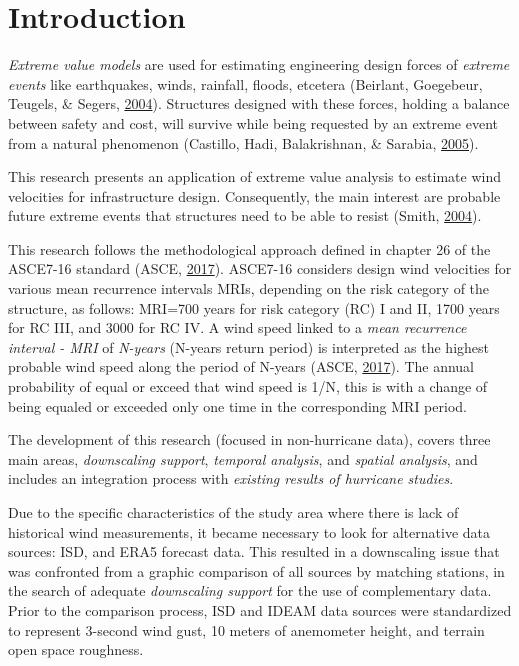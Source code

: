 \documentclass[12pt,twoside]{reedthesis}
\begin{document}
\hypertarget{introduction}{%
\chapter{Introduction}\label{introduction}}

\emph{Extreme value models} are used for estimating engineering design forces of \emph{extreme events} like earthquakes, winds, rainfall, floods, etcetera (Beirlant, Goegebeur, Teugels, \& Segers, \protect\hyperlink{ref-Beirlant2004}{2004}). Structures designed with these forces, holding a balance between safety and cost, will survive while being requested by an extreme event from a natural phenomenon (Castillo, Hadi, Balakrishnan, \& Sarabia, \protect\hyperlink{ref-Castillo2005}{2005}).

This research presents an application of extreme value analysis to estimate wind velocities for infrastructure design. Consequently, the main interest are probable future extreme events that structures need to be able to resist (Smith, \protect\hyperlink{ref-Smith2004}{2004}).

This research follows the methodological approach defined in chapter 26 of the ASCE7-16 standard (ASCE, \protect\hyperlink{ref-Asce2017}{2017}). ASCE7-16 considers design wind velocities for various mean recurrence intervals MRIs, depending on the risk category of the structure, as follows: MRI=700 years for risk category (RC) I and II, 1700 years for RC III, and 3000 for RC IV. A wind speed linked to a \emph{mean recurrence interval - MRI} of \emph{N-years} (N-years return period) is interpreted as the highest probable wind speed along the period of N-years (ASCE, \protect\hyperlink{ref-Asce2017}{2017}). The annual probability of equal or exceed that wind speed is 1/N, this is with a change of being equaled or exceeded only one time in the corresponding MRI period.

The development of this research (focused in non-hurricane data), covers three main areas, \emph{downscaling support}, \emph{temporal analysis}, and \emph{spatial analysis}, and includes an integration process with \emph{existing results of hurricane studies}.

Due to the specific characteristics of the study area where there is lack of historical wind measurements, it became necessary to look for alternative data sources: ISD, and ERA5 forecast data. This resulted in a downscaling issue that was confronted from a graphic comparison of all sources by matching stations, in the search of adequate \emph{downscaling support} for the use of complementary data. Prior to the comparison process, ISD and IDEAM data sources were standardized to represent 3-second wind gust, 10 meters of anemometer height, and terrain open space roughness.
\end{document}
